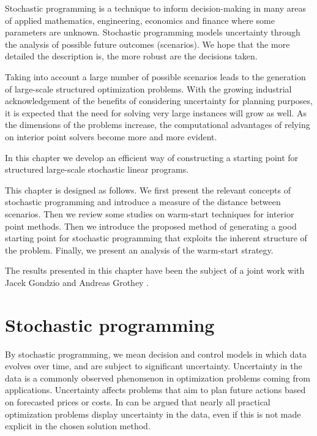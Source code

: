 
%
%
\label{ch:Warmstart}

Stochastic programming \cite{BirgeLouveaux,KallWallace}
is a technique to inform decision-making 
in many areas of applied mathematics, engineering, economics and 
finance where some parameters are unknown.
%
Stochastic programming models uncertainty through the analysis 
of possible future outcomes (scenarios). We hope that the more detailed the 
description is, the more robust are the decisions taken. 

Taking into account a large number of possible scenarios leads
to the generation of large-scale structured optimization problems.
With the growing industrial acknowledgement of the benefits of 
considering uncertainty for planning purposes, it is expected that the 
need for solving very large instances will grow as well.
As the dimensions of the problems increase, the computational advantages 
of relying on interior point solvers become more and more evident. 

In this chapter we develop an efficient way of constructing a 
starting point for structured large-scale stochastic linear programs.

This chapter is designed as follows. We first present the relevant
concepts of stochastic programming and introduce a measure of
the distance between scenarios. Then we review some studies on 
warm-start techniques for interior point methods. Then we introduce 
the proposed method of generating a good starting point for 
stochastic programming that exploits the inherent structure of the
problem. Finally, we present an analysis of the warm-start strategy.

The results presented in this chapter have been the subject
of a joint work with Jacek Gondzio and Andreas Grothey
\cite{ColomboGondzioGrothey06}. 

%
%
\section{Stochastic programming}

By stochastic programming, we mean decision and control models in which 
data evolves over time, and are subject to significant uncertainty.
%
Uncertainty in the data is a commonly observed phenomenon in
optimization problems coming from applications. Uncertainty
affects problems that aim to plan future actions based on forecasted
prices or costs. In can be argued that nearly all practical
optimization problems display uncertainty in the data, even if this is
not made explicit in the chosen solution method. 

